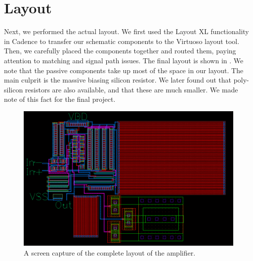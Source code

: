 \documentclass[journal,hidelinks]{IEEEtran}
\begin{document}
\begin{table}[!htb]
  \centering
  \caption{Final transistor dimensions (Part 2).}
  \label{tab:dim-final-2}
\end{table}

\section{Layout}

Next, we performed the actual layout. We first used the Layout XL functionality in Cadence to transfer our schematic components to the Virtuoso layout tool. Then, we carefully placed the components together and routed them, paying attention to matching and signal path issues. The final layout is shown in . We note that the passive components take up most of the space in our layout. The main culprit is the massive biasing silicon resistor. We later found out that poly-silicon resistors are also available, and that these are much smaller. We made note of this fact for the final project.

\begin{figure}[!htb]
  \centering
  \includegraphics[width=\textwidth]{images/layout.png}
  \caption{A screen capture of the complete layout of the amplifier.}
  \label{fig:layout}
\end{figure}
\end{document}
